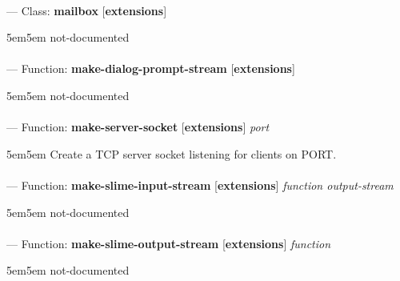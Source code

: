 \paragraph{}
\label{EXTENSIONS:MAILBOX}
--- Class: \textbf{mailbox} [\textbf{extensions}] \textit{}

\begin{adjustwidth}{5em}{5em}
not-documented
\end{adjustwidth}

\paragraph{}
\label{EXTENSIONS:MAKE-DIALOG-PROMPT-STREAM}
--- Function: \textbf{make-dialog-prompt-stream} [\textbf{extensions}] \textit{}

\begin{adjustwidth}{5em}{5em}
not-documented
\end{adjustwidth}

\paragraph{}
\label{EXTENSIONS:MAKE-SERVER-SOCKET}
--- Function: \textbf{make-server-socket} [\textbf{extensions}] \textit{port}

\begin{adjustwidth}{5em}{5em}
Create a TCP server socket listening for clients on PORT.
\end{adjustwidth}

\paragraph{}
\label{EXTENSIONS:MAKE-SLIME-INPUT-STREAM}
--- Function: \textbf{make-slime-input-stream} [\textbf{extensions}] \textit{function output-stream}

\begin{adjustwidth}{5em}{5em}
not-documented
\end{adjustwidth}

\paragraph{}
\label{EXTENSIONS:MAKE-SLIME-OUTPUT-STREAM}
--- Function: \textbf{make-slime-output-stream} [\textbf{extensions}] \textit{function}

\begin{adjustwidth}{5em}{5em}
not-documented
\end{adjustwidth}

